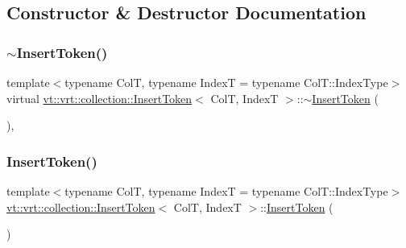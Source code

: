 \subsection{Constructor \& Destructor Documentation}
\mbox{\label{structvt_1_1vrt_1_1collection_1_1_insert_token_a387506c3e013a275665e644d99b75577}} 
\subsubsection{\texorpdfstring{$\sim$\+Insert\+Token()}{~InsertToken()}}
{\footnotesize\ttfamily template$<$typename ColT, typename IndexT = typename Col\+T\+::\+Index\+Type$>$ \\
virtual \hyperlink{structvt_1_1vrt_1_1collection_1_1_insert_token}{vt\+::vrt\+::collection\+::\+Insert\+Token}$<$ ColT, IndexT $>$\+::$\sim$\hyperlink{structvt_1_1vrt_1_1collection_1_1_insert_token}{Insert\+Token} (\begin{DoxyParamCaption}{ }\end{DoxyParamCaption})\hspace{0.3cm}{\ttfamily [virtual]}, {\ttfamily [default]}}

\mbox{\label{structvt_1_1vrt_1_1collection_1_1_insert_token_a4adbc8942df683af9d99216c7d2a40d1}} 
\subsubsection{\texorpdfstring{Insert\+Token()}{InsertToken()}\hspace{0.1cm}{\footnotesize\ttfamily [1/2]}}
{\footnotesize\ttfamily template$<$typename ColT, typename IndexT = typename Col\+T\+::\+Index\+Type$>$ \\
\hyperlink{structvt_1_1vrt_1_1collection_1_1_insert_token}{vt\+::vrt\+::collection\+::\+Insert\+Token}$<$ ColT, IndexT $>$\+::\hyperlink{structvt_1_1vrt_1_1collection_1_1_insert_token}{Insert\+Token} (\begin{DoxyParamCaption}\item[{\hyperlink{structvt_1_1vrt_1_1collection_1_1_insert_token}{Insert\+Token}$<$ ColT, IndexT $>$ const \&}]{ }\end{DoxyParamCaption})\hspace{0.3cm}{\ttfamily [delete]}}

